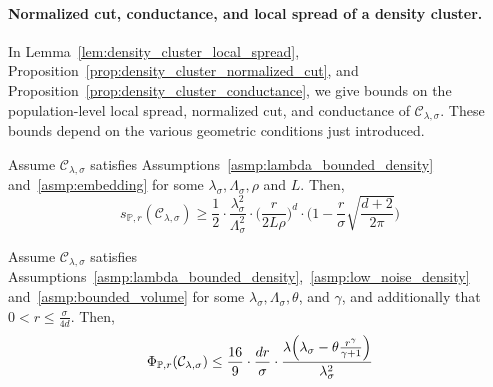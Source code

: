 \documentclass[11pt,twoside]{article}
\newcommand{\1}{\mathbf{1}}
\newcommand{\mc}[1]{\mathcal{#1}}
\newcommand{\Pbb}{\mathbb{P}}
\begin{document}
\paragraph{Normalized cut, conductance, and local spread of a density cluster.} In Lemma~\ref{lem:density_cluster_local_spread}, Proposition~\ref{prop:density_cluster_normalized_cut}, and Proposition~\ref{prop:density_cluster_conductance}, we give bounds on the population-level local spread, normalized cut, and conductance of $\mc{C}_{\lambda,\sigma}$. These bounds depend on the various geometric conditions just introduced. 
\begin{lemma}
	\label{lem:density_cluster_local_spread}
	Assume $\mc{C}_{\lambda,\sigma}$ satisfies Assumptions~\ref{asmp:lambda_bounded_density} and~\ref{asmp:embedding} for some $\lambda_{\sigma},\Lambda_{\sigma},\rho$ and $L$. Then,
	\begin{equation}
	\label{eqn:density_cluster_local_spread}
	s_{\Pbb,r}(\mc{C}_{\lambda,\sigma}) \geq \frac{1}{2} \cdot \frac{\lambda_{\sigma}^2}{\Lambda_{\sigma}^2} \cdot \biggl(\frac{r}{2L\rho}\biggr)^{d} \cdot \biggl(1 - \frac{r}{\sigma} \sqrt{\frac{d + 2}{2\pi}}\biggr)
	\end{equation}
\end{lemma}

\begin{proposition}
	\label{prop:density_cluster_normalized_cut}
	Assume $\mc{C}_{\lambda,\sigma}$ satisfies Assumptions~\ref{asmp:lambda_bounded_density},~\ref{asmp:low_noise_density} and~\ref{asmp:bounded_volume} for some $\lambda_{\sigma}, \Lambda_{\sigma}, \theta$, and $\gamma$, and additionally that $0 < r \leq \frac{\sigma}{4d}$. Then,
	\begin{equation}
	\label{eqn:density_cluster_normalized_cut}
	\Phi_{\Pbb,r}(\mc{C}_{\lambda,\sigma}) \leq \frac{16}{9} \cdot \frac{dr}{\sigma} \cdot \frac{\lambda\Bigl(\lambda_{\sigma} - \theta \frac{r^{\gamma}}{\gamma + 1}\Bigr)}{\lambda_{\sigma}^2}
	\end{equation}
\end{proposition}
\end{document}

